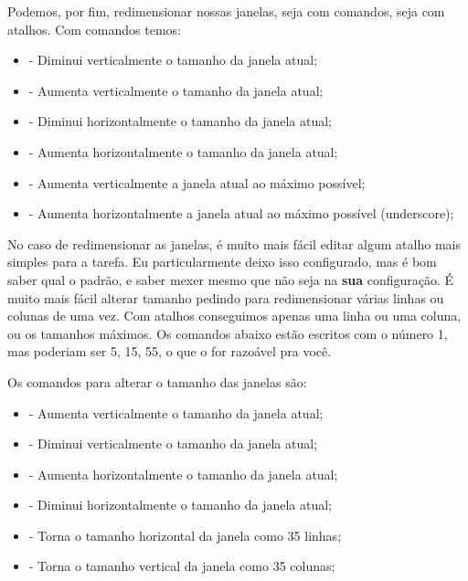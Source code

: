 Podemos, por fim, redimensionar nossas janelas, seja com comandos, seja com atalhos.
Com comandos temos:

\begin{itemize}
    \item {} - Diminui verticalmente o tamanho da janela atual;
    \item {} - Aumenta verticalmente o tamanho da janela atual;
    \item {} - Diminui horizontalmente o tamanho da janela atual;
    \item {} - Aumenta horizontalmente o tamanho da janela atual;
    \item {} - Aumenta verticalmente a janela atual ao máximo possível;
    \item {} - Aumenta horizontalmente a janela atual ao máximo possível (underscore);
\end{itemize}

No caso de redimensionar as janelas, é muito mais fácil editar algum atalho mais simples para a tarefa.
Eu particularmente deixo isso configurado, mas é bom saber qual o padrão, e saber mexer mesmo que não
seja na \textbf{sua} configuração.
É muito mais fácil alterar tamanho pedindo para redimensionar várias linhas ou colunas de uma vez.
Com atalhos conseguimos apenas uma linha ou uma coluna, ou os tamanhos máximos.
Os comandos abaixo estão escritos com o número 1, mas poderiam ser 5, 15, 55, o que o for razoável pra você.

Os comandos para alterar o tamanho das janelas são:
\begin{itemize}
    \item {} - Aumenta verticalmente o tamanho da janela atual;
    \item {} - Diminui verticalmente o tamanho da janela atual;
    \item {} - Aumenta horizontalmente o tamanho da janela atual;
    \item {} - Diminui horizontalmente o tamanho da janela atual;
    \item {} - Torna o tamanho horizontal da janela como 35 linhas;
    \item {} - Torna o tamanho vertical da janela como 35 colunas;
\end{itemize}


